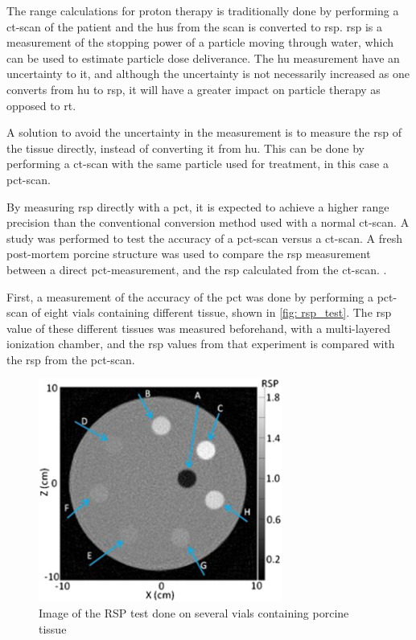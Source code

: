 \documentclass[main.tex]{subfiles}
\begin{document}
The range calculations for proton therapy is traditionally done by performing a \gls{ct}-scan of the patient and the \acrlong{hu}s from the scan is converted to \acrlong{rsp}. \gls{rsp} is a measurement of the stopping power of a particle moving through water, which can be used to estimate particle dose deliverance. The \gls{hu} measurement have an uncertainty to it, and although the uncertainty is not necessarily increased as one converts from \gls{hu} to \gls{rsp}, it will have a greater impact on particle therapy as opposed to \gls{rt}\cite{proton_challenges}.

A solution to avoid the uncertainty in the measurement is to measure the \gls{rsp} of the tissue directly, instead of converting it from \gls{hu}. This can be done by performing a \gls{ct}-scan with the same particle used for treatment, in this case a \acrfull{pct}-scan. 

By measuring \gls{rsp} directly with a \gls{pct}, it is expected to achieve a higher range precision than the conventional conversion method used with a normal ct-scan. A study was performed to test the accuracy of a \gls{pct}-scan versus a \gls{ct}-scan. A fresh post-mortem porcine structure was used to compare the \gls{rsp} measurement between a direct \gls{pct}-measurement, and the \gls{rsp} calculated from the \gls{ct}-scan.  \cite{porcine_2021}.

First, a measurement of the accuracy of the \gls{pct} was done by performing a \gls{pct}-scan of eight vials containing different tissue, shown in \autoref{fig: rsp_test}. The \gls{rsp} value of these different tissues was measured beforehand, with a multi-layered ionization chamber, and the \gls{rsp} values from that experiment is compared with the \gls{rsp} from the \gls{pct}-scan.

\begin{figure}[!htpb]
    \centering
    \includegraphics[width=8cm ]{images/porcine_phantom.jpg}
    \caption{Image of the RSP test done on several vials containing porcine tissue\cite{porcine_2021}}
    \label{fig: rsp_test}
\end{figure}
\FloatBarrier
\end{document}
